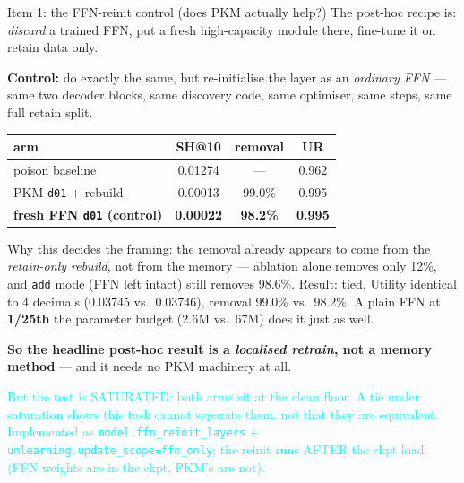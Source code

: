 \documentclass{beamer}
\newcommand{\pierre}[1]{\textcolor{cyan}{#1}}
\begin{document}
\begin{frame}{Item 1: the FFN-reinit control (does PKM actually help?)}
The post-hoc recipe is: \emph{discard} a trained FFN, put a fresh high-capacity
module there, fine-tune it on retain data only.

\medskip
\textbf{Control:} do exactly the same, but re-initialise the layer as an
\emph{ordinary FFN} --- same two decoder blocks, same discovery code, same
optimiser, same steps, same full retain split.
\begin{center}
\begin{tabular}{|l|c|c|c|}
\hline
arm & SH@10 & removal & UR \\
\hline
poison baseline               & 0.01274 & ---    & 0.962 \\
PKM \texttt{d01} $+$ rebuild  & 0.00013 & 99.0\% & 0.995 \\
\textbf{fresh FFN \texttt{d01} (control)} & \textbf{0.00022} & \textbf{98.2\%} & \textbf{0.995} \\
\hline
\end{tabular}
\end{center}

\medskip
\alert{Why this decides the framing:} the removal already appears to come from
the \emph{retain-only rebuild}, not from the memory --- ablation alone removes
only 12\%, and \texttt{add} mode (FFN left intact) still removes 98.6\%.
\alert{Result: tied.} Utility identical to 4 decimals (0.03745 vs.\ 0.03746),
removal 99.0\% vs.\ 98.2\%. A plain FFN at \textbf{1/25th} the parameter budget
(2.6M vs.\ 67M) does it just as well.

\medskip
\textbf{So the headline post-hoc result is a \emph{localised retrain}, not a
memory method} --- and it needs no PKM machinery at all.

\medskip
\pierre{But the test is SATURATED: both arms sit at the clean floor. A tie under
saturation shows this task cannot separate them, not that they are equivalent.}
\pierre{Implemented as \texttt{model.ffn\_reinit\_layers} $+$
\texttt{unlearning.update\_scope=ffn\_only}; the reinit runs AFTER the ckpt load
(FFN weights are in the ckpt, PKM's are not).}
\end{frame}
\end{document}

